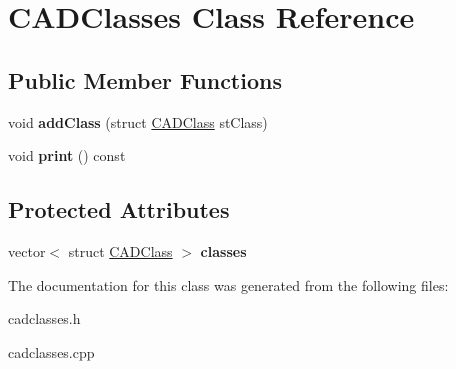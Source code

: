 \hypertarget{class_c_a_d_classes}{}\section{C\+A\+D\+Classes Class Reference}
\label{class_c_a_d_classes}
\subsection*{Public Member Functions}
\begin{DoxyCompactItemize}
\item 
void {\bfseries add\+Class} (struct \hyperlink{struct_c_a_d_class}{C\+A\+D\+Class} st\+Class)\hypertarget{class_c_a_d_classes_a8f2833c90d00c80273398ddf67521745}{}\label{class_c_a_d_classes_a8f2833c90d00c80273398ddf67521745}

\item 
void {\bfseries print} () const \hypertarget{class_c_a_d_classes_a0d34103a182c47192ede8441c14fd290}{}\label{class_c_a_d_classes_a0d34103a182c47192ede8441c14fd290}

\end{DoxyCompactItemize}
\subsection*{Protected Attributes}
\begin{DoxyCompactItemize}
\item 
vector$<$ struct \hyperlink{struct_c_a_d_class}{C\+A\+D\+Class} $>$ {\bfseries classes}\hypertarget{class_c_a_d_classes_a0a411e3a245e3f87f4ce2e5d4f215b32}{}\label{class_c_a_d_classes_a0a411e3a245e3f87f4ce2e5d4f215b32}

\end{DoxyCompactItemize}


The documentation for this class was generated from the following files\+:\begin{DoxyCompactItemize}
\item 
cadclasses.\+h\item 
cadclasses.\+cpp\end{DoxyCompactItemize}
